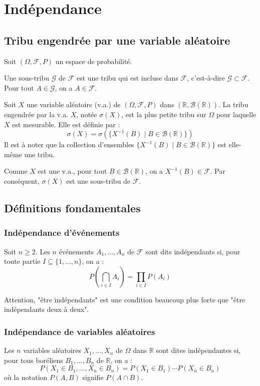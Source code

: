 \chapter{Indépendance}
\sloppy


\section{Tribu engendrée par une variable aléatoire}
Soit $(\Omega, \mathcal{F}, P)$ un espace de probabilité.
\begin{definition}
Une sous-tribu $\mathcal{G}$ de $\mathcal{F}$ est une tribu qui est incluse dans $\mathcal{F}$, c'est-à-dire $\mathcal{G} \subset \mathcal{F}$. Pour tout $A \in \mathcal{G}$, on a $A \in \mathcal{F}$.
\end{definition}
\begin{definition}
Soit $X$ une variable aléatoire (v.a.) de $(\Omega, \mathcal{F}, P)$ dans $(\mathbb{R}, \mathcal{B}(\mathbb{R}))$. La tribu engendrée par la v.a. $X$, notée $\sigma(X)$, est la plus petite tribu sur $\Omega$ pour laquelle $X$ est mesurable. Elle est définie par :
\[ \sigma(X) = \sigma(\{X^{-1}(B) \mid B \in \mathcal{B}(\mathbb{R})\}) \]
Il est à noter que la collection d'ensembles $\{X^{-1}(B) \mid B \in \mathcal{B}(\mathbb{R})\}$ est elle-même une tribu.
\end{definition}
Comme $X$ est une v.a., pour tout $B \in \mathcal{B}(\mathbb{R})$, on a $X^{-1}(B) \in \mathcal{F}$. Par conséquent, $\sigma(X)$ est une sous-tribu de $\mathcal{F}$.
\section{Définitions fondamentales}
\subsection{Indépendance d'événements}
\begin{definition}
Soit $n \ge 2$. Les $n$ événements $A_1, \ldots, A_n$ de $\mathcal{F}$ sont dits indépendants si, pour toute partie $I \subseteq \{1, \ldots, n\}$, on a :
\[ P\left(\bigcap_{i \in I} A_i\right) = \prod_{i \in I} P(A_i) \]
\end{definition}
\begin{remark}
Attention, "être indépendants" est une condition beaucoup plus forte que "être indépendants deux à deux".
\end{remark}
\subsection{Indépendance de variables aléatoires}
\begin{definition}
Les $n$ variables aléatoires $X_1, \ldots, X_n$ de $\Omega$ dans $\mathbb{R}$ sont dites indépendantes si, pour tous boréliens $B_1, \ldots, B_n$ de $\mathbb{R}$, on a :
\[ P(X_1 \in B_1, \ldots, X_n \in B_n) = P(X_1 \in B_1) \cdots P(X_n \in B_n) \]
où la notation $P(A, B)$ signifie $P(A \cap B)$.
\end{definition}

